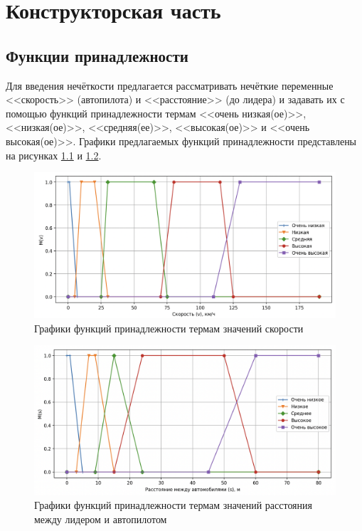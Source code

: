 \chapter{Конструкторская часть}

\section{Функции принадлежности}

Для введения нечёткости предлагается рассматривать нечёткие переменные <<скорость>> (автопилота) и <<расстояние>> (до лидера) и задавать их с помощью функций принадлежности термам <<очень низкая(ое)>>, <<низкая(ое)>>, <<средняя(ее)>>, <<высокая(ое)>> и <<очень высокая(ое)>>. Графики предлагаемых функций принадлежности представлены на рисунках \ref{img:v} и \ref{img:s}.

\begin{figure}[h!]
	\begin{center}
		\includegraphics[width=\textwidth]{images/v.png}
	\end{center}
	\caption{Графики функций принадлежности термам значений скорости}
	\label{img:v}
\end{figure}

\begin{figure}[h!]
	\begin{center}
		\includegraphics[width=\textwidth]{images/s.png}
	\end{center}
	\caption{Графики функций принадлежности термам значений расстояния между лидером и автопилотом}
	\label{img:s}
\end{figure}

